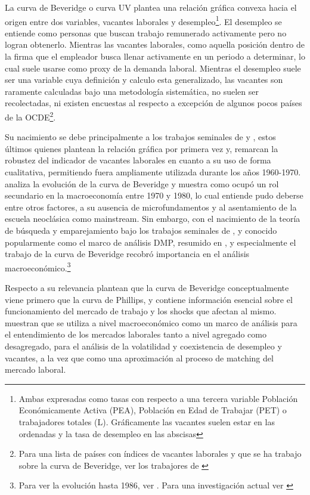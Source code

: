 La curva de Beveridge o curva UV plantea una relación gráfica convexa hacia el origen entre dos variables, vacantes laborales y desempleo\footnote{Ambas expresadas como tasas con respecto a una tercera variable Población Económicamente Activa (PEA), Población en Edad de Trabajar (PET) o trabajadores totales (L). Gráficamente las vacantes suelen estar en las ordenadas y la tasa de desempleo en las abscisas}. El desempleo se entiende como personas que buscan trabajo remunerado activamente pero no logran obtenerlo. Mientras las vacantes laborales, como aquella posición dentro de la firma que el empleador busca llenar activamente en un periodo a determinar, lo cual suele usarse como proxy de la demanda laboral.
Mientras el desempleo suele ser una variable cuya definición y calculo esta generalizado, las vacantes son raramente calculadas bajo una metodología sistemática, no suelen ser recolectadas, ni existen encuestas al respecto a excepción de algunos pocos países de la OCDE\footnote{Para una lista de países con índices de vacantes laborales y que se ha trabajo sobre la curva de Beveridge, ver los trabajores de \cite{Hobijn2013, Nickell2002}}.

Su nacimiento se debe principalmente a los trabajos seminales de \cite{Beveridge} y \cite{Dicks-Mireaux1958}, estos últimos quienes plantean la relación gráfica por primera vez y, remarcan la robustez del indicador de vacantes laborales en cuanto a su uso de forma cualitativa, permitiendo fuera ampliamente utilizada durante los años 1960-1970. \cite{Rodenburg2007} analiza la evolución de la curva de Beveridge y muestra como ocupó un rol secundario en la macroeconomía entre 1970 y 1980, lo cual entiende pudo deberse entre otros factores, a su ausencia de microfundamentos y al asentamiento de la escuela neoclásica como mainstream. Sin embargo, con el nacimiento de la teoría de búsqueda y emparejamiento bajo los trabajos seminales de \cite{Pissarides1985}, \cite{Mortensen1994} y \cite{Diamond1982} conocido popularmente como el marco de análisis DMP, resumido en \cite{Pissarides2000}, y especialmente el trabajo de \cite{Blanchard1989} la curva de Beveridge recobró importancia en el análisis macroeconómico.\footnote{Para ver la evolución hasta 1986, ver \cite{Mortensen1986}. Para una investigación actual ver \cite{Elsby2015}}  

Respecto a su relevancia \cite{Blanchard1989} plantean que la curva de Beveridge conceptualmente viene primero que la curva de Phillips, y contiene información esencial sobre el funcionamiento del mercado de trabajo y los shocks que afectan al mismo. \cite{Elsby2015} muestran que se utiliza a nivel macroeconómico como un marco de análisis para el entendimiento de los mercados laborales tanto a nivel agregado como desagregado, para el análisis de la volatilidad y coexistencia de desempleo y vacantes, a la vez que como una aproximación al proceso de matching del mercado laboral.

